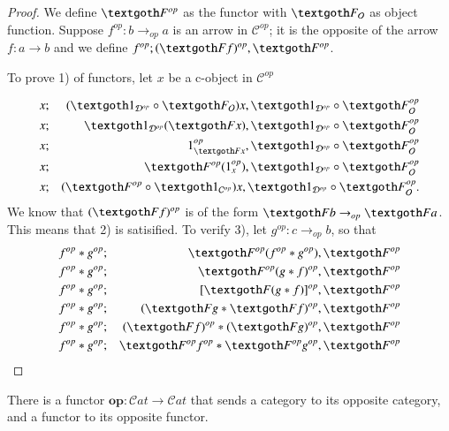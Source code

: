 \documentclass [12pt]{book}
\begin{document}
\begin{proof}We define $\textgoth F^{op}$ as the functor with $\textgoth F_\mathcal O$ as object function. Suppose $f^{op}:b\rightarrow_{op}a$ is an arrow in $\mathcal C^{op}$; it is the opposite of the arrow $f:a\rightarrow b$ and we define $f^{op};(\textgoth Ff)^{op},\textgoth F^{op}$.

To prove 1) of functors, let $x$ be a c-object in $\mathcal C^{op}$

\begin{eqnarray}\nonumber x&;&(\textgoth1_{\mathcal D^{op}}\circ\textgoth F_\mathcal O)x,\textgoth1_{\mathcal D^{op}}\circ\textgoth F^{op}_\mathcal O\\\nonumber x&;&\textgoth1_{\mathcal D^{op}}(\textgoth Fx),\textgoth1_{\mathcal D^{op}}\circ\textgoth F^{op}_\mathcal O\\\nonumber x&;&1_{\textgoth Fx}^{op},\textgoth1_{\mathcal D^{op}}\circ\textgoth F^{op}_\mathcal O\\\nonumber x&;&\textgoth F^{op}(1_x^{op}),\textgoth1_{\mathcal D^{op}}\circ\textgoth F^{op}_\mathcal O\\\nonumber x&;&(\textgoth F^{op}\circ\textgoth1_{\mathcal C^{op}})x,\textgoth1_{\mathcal D^{op}}\circ\textgoth F^{op}_\mathcal O.\end{eqnarray}We know that $(\textgoth Ff)^{op}$ is of the form $\textgoth Fb\rightarrow_{op}\textgoth Fa$. This means that 2) is satisified. To verify 3), let $g^{op}:c\rightarrow_{op}b$, so that \begin{eqnarray}\nonumber f^{op}*g^{op}&;&\textgoth F^{op}(f^{op}*g^{op}),\textgoth F^{op}\\\nonumber f^{op}*g^{op}&;&\textgoth F^{op}(g*f)^{op},\textgoth F^{op}\\\nonumber f^{op}*g^{op}&;&[\textgoth F(g*f)]^{op},\textgoth F^{op}\\\nonumber f^{op}*g^{op}&;&(\textgoth Fg*\textgoth Ff)^{op},\textgoth F^{op}\\\nonumber f^{op}*g^{op}&;&(\textgoth Ff)^{op}*(\textgoth Fg)^{op},\textgoth F^{op}\\\nonumber f^{op}*g^{op}&;&\textgoth F^{op}f^{op}*\textgoth F^{op}g^{op},\textgoth F^{op}\end{eqnarray}\end{proof}

\begin{theorem}There is a functor $\textbf{op}:\mathcal Cat\rightarrow\mathcal Cat$ that sends a category to its opposite category, and a functor to its opposite functor.\end{theorem}
\end{document}
